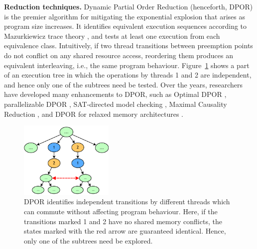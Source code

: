 {\bf Reduction techniques.}
Dynamic Partial Order Reduction \cite{dpor} (henceforth, DPOR) is the premier algorithm for mitigating the exponential explosion that arises as program size increases.
It identifies equivalent execution sequences according to Mazurkiewicz trace theory \cite{mazurkiewicz},
and tests at least one execution from each equivalence class.
Intuitively, if two thread transitions between preemption points do not conflict on any shared resource access, reordering them produces an equivalent interleaving, i.e., the same program behaviour.
Figure~\ref{fig:dpor} shows a part of an execution tree in which the operations by threads 1 and 2 are independent, and hence only one of the subtrees need be tested.
Over the years, researchers have developed many enhancements to DPOR, such as Optimal DPOR \cite{optimal-dpor}, parallelizable DPOR \cite{parallel-dpor}, SAT-directed model checking \cite{satcheck}, Maximal Causality Reduction \cite{mcr}, and DPOR for relaxed memory architectures \cite{tsopso}.

\begin{figure}[t]
	\begin{center}
	\includegraphics[width=0.4\textwidth]{dpor.pdf}
	\end{center}
	\caption{DPOR identifies independent transitions by different threads which can commute without affecting program behaviour. Here, if the transitions marked 1 and 2 have no shared memory conflicts, the states marked with the red arrow are guaranteed identical. Hence, only one of the subtrees need be explored.}
	\label{fig:dpor}
\end{figure}

